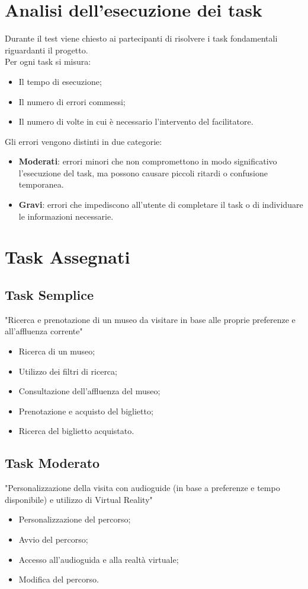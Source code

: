 \documentclass{article}
\begin{document}
\section{Analisi dell’esecuzione dei task}
Durante il test viene chiesto ai partecipanti di risolvere i task fondamentali riguardanti il progetto.\\
Per ogni task si misura:
\begin{itemize}
    \item Il tempo di esecuzione;
    \item Il numero di errori commessi;
    \item Il numero di volte in cui \`e necessario l’intervento del facilitatore.
\end{itemize}
Gli errori vengono distinti in due categorie:
\begin{itemize}
    \item \textbf{Moderati}: errori minori che non compromettono in modo significativo l'esecuzione del task, ma possono causare piccoli ritardi o confusione temporanea. 
    \item \textbf{Gravi}: errori che impediscono all'utente di completare il task o di individuare le informazioni necessarie.
\end{itemize}

\newpage

\section{Task Assegnati}
\subsection*{Task Semplice}
"Ricerca e prenotazione di un museo da visitare in base alle proprie preferenze e all’affluenza corrente"
\begin{itemize}
    \item Ricerca di un museo;
    \item Utilizzo dei filtri di ricerca;
    \item Consultazione dell’affluenza del museo;
    \item Prenotazione e acquisto del biglietto;
    \item Ricerca del biglietto acquistato.
\end{itemize}

\subsection*{Task Moderato}
"Personalizzazione della visita con audioguide (in base a preferenze e tempo disponibile) e utilizzo di Virtual Reality"
\begin{itemize}
    \item Personalizzazione del percorso;
    \item Avvio del percorso;
    \item Accesso all'audioguida e alla realt\`a virtuale;
    \item Modifica del percorso.
\end{itemize}
\end{document}
